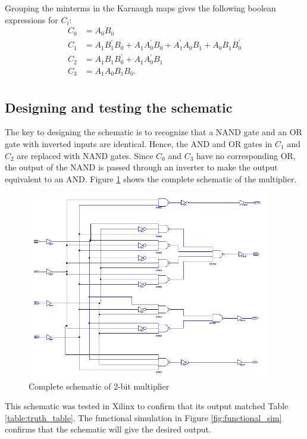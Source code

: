 \documentclass[11pt]{article}
\begin{document}
Grouping the minterms in the Karnaugh maps gives the following boolean expressions for $C_i$:
\begin{align*}
	C_0 &= A_0 B_0 \\
	C_1 &= A_1 B_1^{\prime} B_0 + A_1 A_0^{\prime} B_0 + A_1^{\prime} A_0 B_1 + A_0 B_1 B_0^{\prime} \\
	C_2 &= A_1 B_1 B_0^{\prime} + A_1 A_0^{\prime} B_1 \\
	C_3 &= A_1 A_0 B_1 B_0. \\
\end{align*}	

\subsection{Designing and testing the schematic}
The key to designing the schematic is to recognize that a NAND gate and an OR gate with inverted inputs are identical. Hence, the AND and OR gates in $C_1$ and $C_2$ are replaced with NAND gates. Since $C_0$ and $C_3$ have no corresponding OR, the output of the NAND is passed through an inverter to make the output equivalent to an AND. Figure \ref{fig:schematic} shows the complete schematic of the multiplier.

\begin{figure}[htbp]
	\centering
	\includegraphics[width=0.95\textwidth, draft=false]{schematic}
	\caption{Complete schematic of 2-bit multiplier}
	\label{fig:schematic}
\end{figure}

This schematic was tested in Xilinx to confirm that its output matched Table \ref{table:truth_table}. The functional simulation in Figure \ref{fig:functional_sim} confirms that the schematic will give the desired output.
\end{document}
